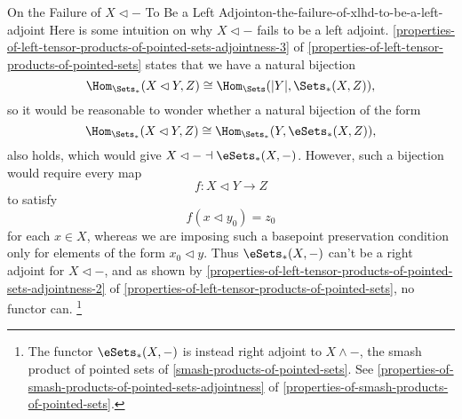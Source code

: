 \begin{remark}{On the Failure of $X\lhd-$ To Be a Left Adjoint}{on-the-failure-of-xlhd-to-be-a-left-adjoint}%
    Here is some intuition on why $X\lhd-$ fails to be a left adjoint. \cref{properties-of-left-tensor-products-of-pointed-sets-adjointness-3} of \cref{properties-of-left-tensor-products-of-pointed-sets} states that we have a natural bijection
    \[
        \Hom_{\Sets_{*}}(X\lhd Y,Z)%
        \cong
        \Hom_{\Sets}(|Y|,\Sets_{*}(X,Z)),%
    \]%
    so it would be reasonable to wonder whether a natural bijection of the form
   \[
        \Hom_{\Sets_{*}}(X\lhd Y,Z)%
        \cong
        \Hom_{\Sets_{*}}(Y,\eSets_{*}(X,Z)),%
    \]%
    also holds, which would give $X\lhd-\dashv\eSets_{*}(X,-)$. However, such a bijection would require every map
    \[
        f%
        \colon%
        X\lhd Y%
        \to%
        Z%
    \]%
    to satisfy
    \[
        f(x\lhd y_{0})%
        =%
        z_{0}%
    \]%
    for each $x\in X$, whereas we are imposing such a basepoint preservation condition only for elements of the form $x_{0}\lhd y$. Thus $\eSets_{*}(X,-)$ can't be a right adjoint for $X\lhd-$, and as shown by \cref{properties-of-left-tensor-products-of-pointed-sets-adjointness-2} of \cref{properties-of-left-tensor-products-of-pointed-sets}, no functor can.%
    \footnote{%
        The functor $\eSets_{*}(X,-)$ is instead right adjoint to $X\wedge-$, the smash product of pointed sets of \cref{smash-products-of-pointed-sets}. See \cref{properties-of-smash-products-of-pointed-sets-adjointness} of \cref{properties-of-smash-products-of-pointed-sets}.
        \par\vspace*{\TCBBoxCorrection}
    }%
\end{remark}
